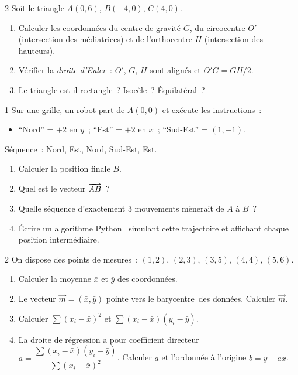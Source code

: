 \begin{probleme}{2}
Soit le triangle $A(0,6)$, $B(-4,0)$, $C(4,0)$.
\begin{enumerate}
  \item Calculer les coordonn\'ees du centre de gravité $G$,
        du circocentre $O'$ (intersection des m\'ediatrices)
        et de l'orthocentre $H$ (intersection des hauteurs).
  \item V\'erifier la \emph{droite d'Euler}~: $O'$, $G$, $H$ sont align\'es
        et $O'G = G H/2$.
  \item Le triangle est-il rectangle~? Isoc\`ele~? \'Equilat\'eral~?
\end{enumerate}
\end{probleme}

\begin{probleme}{1}
Sur une grille, un robot part de $A(0,0)$ et ex\'ecute les instructions~:
\begin{itemize}
  \item ``Nord'' = $+2$ en $y$~;
        ``Est'' = $+2$ en $x$~;
        ``Sud-Est'' = $(1,-1)$.
\end{itemize}
S\'equence~: Nord, Est, Nord, Sud-Est, Est.
\begin{enumerate}
  \item Calculer la position finale $B$.
  \item Quel est le vecteur $\overrightarrow{AB}$~?
  \item Quelle s\'equence d'exactement $3$ mouvements m\`enerait de $A$ \`a $B$~?
  \item \'Ecrire un algorithme Python \computer\ simulant cette trajectoire
        et affichant chaque position interm\'ediaire.
\end{enumerate}
\end{probleme}

\begin{probleme}{2}
On dispose des points de mesures~:
$(1,2)$, $(2,3)$, $(3,5)$, $(4,4)$, $(5,6)$.
\begin{enumerate}
  \item Calculer la moyenne $\bar{x}$ et $\bar{y}$ des coordonn\'ees.
  \item Le vecteur $\vec{m}=(\bar{x},\bar{y})$ pointe vers le \og barycentre\fg\
        des donn\'ees. Calculer $\vec{m}$.
  \item Calculer $\sum(x_i-\bar{x})^2$ et $\sum(x_i-\bar{x})(y_i-\bar{y})$.
  \item La droite de r\'egression a pour coefficient directeur
        $a = \dfrac{\sum(x_i-\bar{x})(y_i-\bar{y})}{\sum(x_i-\bar{x})^2}$.
        Calculer $a$ et l'ordonn\'ee \`a l'origine $b=\bar{y}-a\bar{x}$.
\end{enumerate}
\end{probleme}

